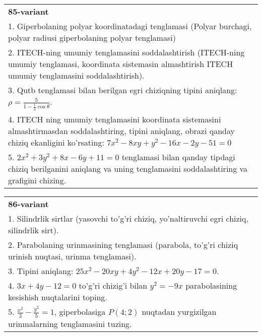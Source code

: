\documentclass{article}
\begin{document}
\begin{tabular}{m{17cm}}
\textbf{85-variant}\\
1. Giperbolaning polyar koordinatadagi tenglamasi (Polyar burchagi, polyar radiusi giperbolaning polyar tenglamasi)\\

2. ITECH-ning umumiy tenglamasini soddalashtirish (ITECH-ning umumiy tenglamasi, koordinata sistemasin almashtirish ITECH umumiy tenglamasini soddalashtirish).\\

3. Qutb tenglamasi bilan berilgan egri chiziqning tipini aniqlang: $\rho=\frac{5}{1-\frac{1}{2}\cos\theta}$.\\

4. ITECH ning umumiy tenglamasini koordinata sistemasini almashtirmasdan soddalashtiring, tipini aniqlang, obrazi qanday chiziq ekanligini ko'rsating: $7x^{2} - 8xy + y^{2} - 16x - 2y - 51 = 0$\\

5. $2x^{2} + 3y^{2} + 8x - 6y + 11 = 0$ tenglamasi bilan qanday tipdagi chiziq berilganini aniqlang va uning tenglamasini soddalashtiring va grafigini chizing.  
\end{tabular}
\vspace{1cm}


\begin{tabular}{m{17cm}}
\textbf{86-variant}\\
1. Silindrlik sirtlar (yasovchi to'g'ri chiziq, yo'naltiruvchi egri chiziq, silindrlik sirt).\\

2. Parabolaning urinmasining tenglamasi (parabola, to'g'ri chiziq urinish nuqtasi, urinma tenglamasi).\\

3. Tipini aniqlang: $25x^{2}-20xy+4y^{2}-12x+20y-17=0$.\\

4. $3x + 4y - 12 = 0$ to'g'ri chizig'i bilan $y^{2} = - 9x$ parabolasining kesishish nuqtalarini toping.  \\

5. $\frac{x^{2}}{3} - \frac{y^{2}}{5} = 1$, giperbolasiga $P(4;2)$ nuqtadan yurgizilgan urinmalarning tenglamasini tuzing.  
\end{tabular}
\vspace{1cm}
\end{document}
